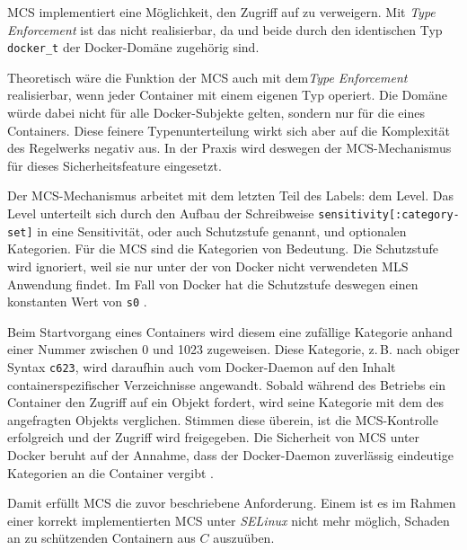 \documentclass[../main.tex]{subfiles}
\begin{document}
					MCS implementiert eine Möglichkeit, \cbroken{} den Zugriff auf \cvalid{} zu verweigern. Mit \emph{Type Enforcement} ist das nicht realisierbar, da \cbroken{} und \cvalid{} beide durch den identischen Typ \texttt{docker\_t} der Docker-Domäne zugehörig sind.

					Theoretisch wäre die Funktion der MCS auch mit dem\emph{Type Enforcement} realisierbar, wenn jeder Container mit einem eigenen Typ operiert. Die Domäne würde dabei nicht für alle Docker-Subjekte gelten, sondern nur für die eines Containers. Diese feinere Typenunterteilung wirkt sich aber auf die Komplexität des Regelwerks negativ aus. In der Praxis wird deswegen der MCS-Mechanismus für dieses Sicherheitsfeature eingesetzt.


					Der MCS-Mechanismus arbeitet mit dem letzten Teil des Labels: dem Level. Das Level unterteilt sich durch den Aufbau der Schreibweise \texttt{sensitivity[:category-set]} in eine Sensitivität, oder auch Schutzstufe genannt, und optionalen Kategorien. Für die MCS sind die Kategorien von Bedeutung. Die Schutzstufe wird ignoriert, weil sie nur unter der von Docker nicht verwendeten \acrshort{MLS} Anwendung findet. Im Fall von Docker hat die Schutzstufe deswegen einen konstanten Wert von \texttt{s0} \cite{selinuxRedhatMCS}\cite{selinuxJamesMorrisMCS}.

					Beim Startvorgang eines Containers wird diesem eine zufällige Kategorie anhand einer Nummer zwischen 0 und 1023 zugeweisen. Diese Kategorie, z.\,B. nach obiger Syntax \texttt{c623}, wird daraufhin auch vom Docker-Daemon auf den Inhalt containerspezifischer Verzeichnisse angewandt. Sobald während des Betriebs ein Container den Zugriff auf ein Objekt fordert, wird seine Kategorie mit dem des angefragten Objekts verglichen. Stimmen diese überein, ist die MCS-Kontrolle erfolgreich und der Zugriff wird freigegeben. Die Sicherheit von MCS unter Docker beruht auf der Annahme, dass der Docker-Daemon zuverlässig eindeutige Kategorien an die Container vergibt \cite[S.200f.]{learningDocker}.



					Damit erfüllt MCS die zuvor beschriebene Anforderung. Einem \cbroken{} ist es im Rahmen einer korrekt implementierten MCS unter \emph{SELinux} nicht mehr möglich, Schaden an zu schützenden Containern aus \(C\) auszuüben.
\end{document}
